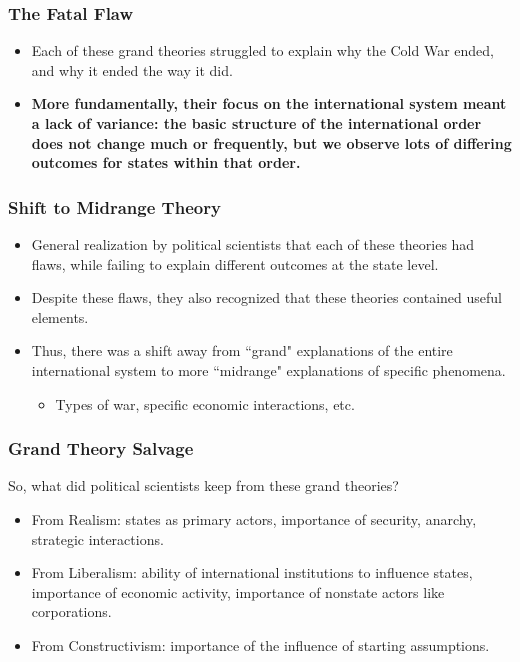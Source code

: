 \documentclass[handout]{beamer}
\begin{document}
\begin{frame} 
	\frametitle{\LARGE{The Fatal Flaw}}
	\begin{itemize}
		\item Each of these grand theories struggled to explain why the Cold War ended, and why it ended the way it did. \pause
		\item \textbf{More fundamentally, their focus on the international system meant a lack of variance: the basic structure of the international order does not change much or frequently, but we observe lots of differing outcomes for states within that order.}
	\end{itemize}
\end{frame}
    
\begin{frame} 
	\frametitle{\LARGE{Shift to Midrange Theory}}
	\begin{itemize}
		\item General realization by political scientists that each of these theories had flaws, while failing to explain different outcomes at the state level. \pause
		\item Despite these flaws, they also recognized that these theories contained useful elements. \pause
		\item Thus, there was a shift away from ``grand" explanations of the entire international system to more ``midrange" explanations of specific phenomena. 
		\begin{itemize}
			\item Types of war, specific economic interactions, etc.
		\end{itemize}
	\end{itemize}
\end{frame}

\begin{frame} 
	\frametitle{\LARGE{Grand Theory Salvage}}
So, what did political scientists keep from these grand theories?
	\begin{itemize}
		\item From Realism: states as primary actors, importance of security, anarchy, strategic interactions. \pause
		\item From Liberalism: ability of international institutions to influence states, importance of economic activity, importance of nonstate actors like corporations. \pause
		\item From Constructivism: importance of the influence of starting assumptions.		
	\end{itemize}
\end{frame}
\end{document}
